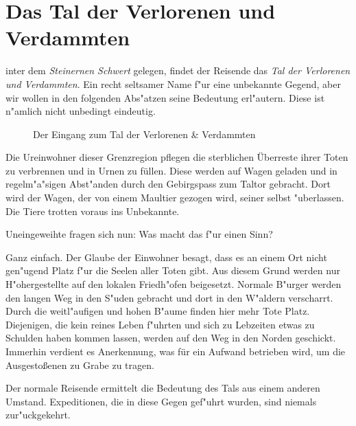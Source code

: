 \section{Das Tal der Verlorenen und Verdammten}
\label{verloreneundverdammte}
inter dem
\textit{Steinernen Schwert} gelegen, findet der Reisende das
\textit{Tal der Verlorenen und Verdammten}. Ein recht seltsamer Name
f"ur eine unbekannte Gegend, aber wir wollen in den folgenden
Abs"atzen seine Bedeutung erl"autern. Diese ist n"amlich nicht
unbedingt eindeutig.
\begin{figure}[hbtp]
\begin{center}
\caption{Der Eingang zum Tal der Verlorenen \& Verdammten}
\end{center}
\end{figure}
\par Die Ureinwohner dieser Grenzregion pflegen die sterblichen Überreste
ihrer Toten zu verbrennen und in Urnen zu füllen. Diese werden auf
Wagen geladen und in regelm"a"sigen Abst"anden durch den Gebirgspass
zum Taltor gebracht. Dort wird der Wagen, der von einem Maultier
gezogen wird, seiner selbst "uberlassen. Die Tiere trotten voraus
ins Unbekannte.
\par Uneingeweihte fragen sich nun: Was macht das f"ur einen Sinn?
\par Ganz einfach. Der Glaube der Einwohner besagt, dass es an einem
Ort nicht gen"ugend Platz f"ur die Seelen aller Toten gibt. Aus
diesem Grund werden nur H"ohergestellte auf den lokalen Friedh"ofen
beigesetzt. Normale B"urger werden den langen Weg in den S"uden
gebracht und dort in den W"aldern verscharrt. Durch die
weitl"aufigen und hohen B"aume finden hier mehr Tote Platz.
Diejenigen, die kein reines Leben f"uhrten und sich zu Lebzeiten
etwas zu Schulden haben kommen lassen, werden auf den Weg in den
Norden geschickt. Immerhin verdient es Anerkennung, was für ein
Aufwand betrieben wird, um die Ausgestoßenen zu Grabe zu tragen.

\par Der normale Reisende ermittelt die Bedeutung des Tals aus
einem anderen Umstand. Expeditionen, die in diese Gegen gef"uhrt
wurden, sind niemals zur"uckgekehrt.
